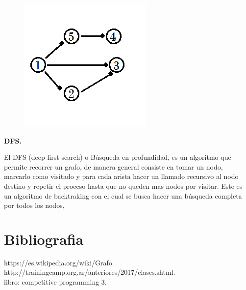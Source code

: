 \documentclass[12pt, a4paper]{article}
\newcommand\cppfile[2][]{

}
\newcommand{\subtitulo}[1]{\begin{center}\textbf{#1}\end{center}}
\begin{document}
	\begin{figure}[!htb]
			\centering
			\includegraphics[scale=1]{Grafos/imagenes/grafo_ejemplo_lista_ady}
			\caption{}%
		\endminipage
			\centering
			
			\cppfile[6-14]{Grafos/codigos/DFS.cpp}
		\endminipage
	\end{figure}	
	
	\subtitulo{DFS.}
	
	El DFS (deep first search) o Búsqueda en profundidad, es un algoritmo que permite recorrer un grafo, de manera
	general consiste en tomar un nodo, marcarlo como visitado y para cada arista hacer un llamado recursivo al nodo
	destino y repetir el proceso hasta que no queden mas nodos por visitar. Este es un algoritmo de backtraking con
	el cual se busca hacer una búsqueda completa por todos los nodos, 
	
	\section{Bibliografia}
	https://es.wikipedia.org/wiki/Grafo\\
	http://trainingcamp.org.ar/anteriores/2017/clases.shtml.\\ 
	libro: competitive programming 3.\\ 



	
\end{document}
